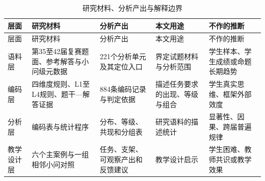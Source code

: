\documentclass[
  12pt,
  a4paper,twoside,openany]{ctexbook}
\begin{document}
\begin{longtable}[]{@{}
  >{\raggedright\arraybackslash}p{}
  >{\raggedright\arraybackslash}p{}
  >{\raggedright\arraybackslash}p{}
  >{\raggedright\arraybackslash}p{}
  >{\raggedright\arraybackslash}p{}@{}}
\caption{研究材料、分析产出与解释边界}\tabularnewline
\toprule\noalign{}
\rowcolor{ThesisPale}
\begin{minipage}[b]{\linewidth}\raggedright
层面
\end{minipage} & \begin{minipage}[b]{\linewidth}\raggedright
研究材料
\end{minipage} & \begin{minipage}[b]{\linewidth}\raggedright
分析产出
\end{minipage} & \begin{minipage}[b]{\linewidth}\raggedright
本文用途
\end{minipage} & \begin{minipage}[b]{\linewidth}\raggedright
不作的推断
\end{minipage} \\
\midrule\noalign{}
\endfirsthead
\toprule\noalign{}
\rowcolor{ThesisPale}
\begin{minipage}[b]{\linewidth}\raggedright
层面
\end{minipage} & \begin{minipage}[b]{\linewidth}\raggedright
研究材料
\end{minipage} & \begin{minipage}[b]{\linewidth}\raggedright
分析产出
\end{minipage} & \begin{minipage}[b]{\linewidth}\raggedright
本文用途
\end{minipage} & \begin{minipage}[b]{\linewidth}\raggedright
不作的推断
\end{minipage} \\
\midrule\noalign{}
\endhead
\bottomrule\noalign{}
\endlastfoot
语料层 & 第35至42届复赛题面、参考解答与小问级元数据 &
221个分析单元及其定位入口 & 界定试题材料与分析范围 &
学生样本、学生成绩或命题长期趋势 \\
编码层 & 四维度规则、L1至L4规则、题干---解答证据 &
884条编码记录与判定依据 & 描述任务要求的出现、等级与组合 &
学生真实思维、框架外部效度 \\
分析层 & 编码表与统计程序 & 分布、等级、共现和分组表 &
研究语料的描述统计 & 显著性、因果、跨届普遍规律 \\
教学设计层 & 六个主案例与一组相邻小问对照 &
任务、支架、可观察产出和反馈建议 & 教学设计启示 &
学生困难、教师共识或教学效果 \\
\end{longtable}
\end{document}
